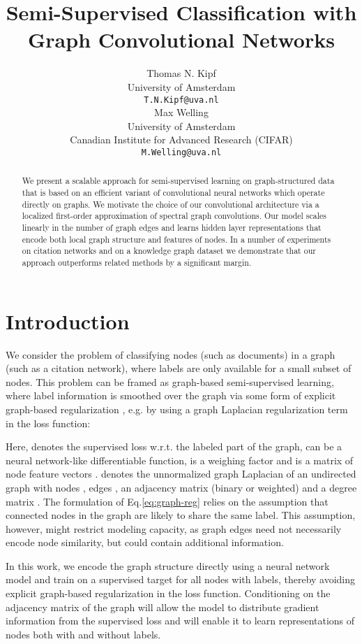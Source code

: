 \documentclass{article} \usepackage{iclr2017_conference,times}
\title{Semi-Supervised Classification with \\Graph Convolutional Networks}
\author{Thomas N. Kipf\\
University of Amsterdam \\
\texttt{T.N.Kipf@uva.nl} \\
\And
Max Welling\\
University of Amsterdam \\
Canadian Institute for Advanced Research (CIFAR)\\
\texttt{M.Welling@uva.nl} \\
}
\makeatletter
\newcommand*{\eg}{e.g.\@\xspace}
\newcommand*{\wrt}{w.r.t.\@\xspace}
\newcommand*{\eq}{Eq.\@\xspace}
\makeatother
\begin{document}
\maketitle

\begin{abstract}
We present a scalable approach for semi-supervised learning on graph-structured data that is based on an efficient variant of convolutional neural networks which operate directly on graphs. We motivate the choice of our convolutional architecture via a localized first-order approximation of spectral graph convolutions. Our model scales linearly in the number of graph edges and learns hidden layer representations that encode both local graph structure and features of nodes. In a number of experiments on citation networks and on a knowledge graph dataset we demonstrate that our approach outperforms related methods by a significant margin.
\end{abstract}

\section{Introduction}
We consider the problem of classifying nodes (such as documents) in a graph (such as a citation network), where labels are only available for a small subset of nodes. This problem can be framed as graph-based semi-supervised learning, where label information is smoothed over the graph via some form of explicit graph-based regularization \citep{zhu2003semi, zhou2004learning, belkin2006manifold, weston2012deep}, \eg by using a graph Laplacian regularization term in the loss function:

Here,  denotes the supervised loss \wrt the labeled part of the graph,  can be a neural network-like differentiable function,  is a weighing factor and  is a matrix of node feature vectors .  denotes the unnormalized graph Laplacian of an undirected graph  with  nodes , edges , an adjacency matrix  (binary or weighted) and a degree matrix . The formulation of \eq \ref{eq:graph-reg} relies on the assumption that connected nodes in the graph are likely to share the same label. This assumption, however, might restrict modeling capacity, as graph edges need not necessarily encode node similarity, but could contain additional information.

In this work, we encode the graph structure directly using a neural network model  and train on a supervised target  for all nodes with labels, thereby avoiding explicit graph-based regularization in the loss function. Conditioning  on the adjacency matrix of the graph will allow the model to distribute gradient information from the supervised loss  and will enable it to learn representations of nodes both with and without labels.
\end{document}
